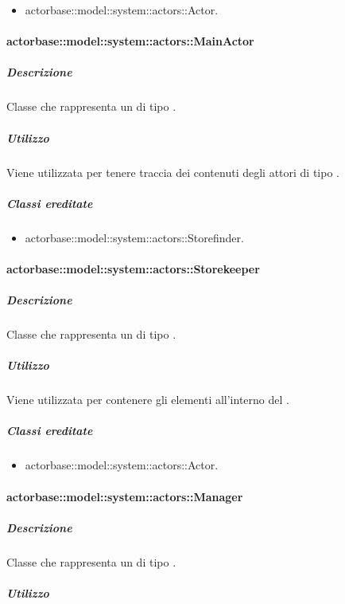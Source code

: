 \documentclass{scalatekids-article}
\begin{document}
\begin{itemize}
\item actorbase::model::system::actors::Actor.
\end{itemize}

\paragraph{actorbase::model::system::actors::MainActor}

\subparagraph{Descrizione}

Classe che rappresenta un  di tipo .

\subparagraph{Utilizzo}

Viene utilizzata per tenere traccia dei contenuti degli attori di tipo .

\subparagraph{Classi ereditate}

\begin{itemize}
\item actorbase::model::system::actors::Storefinder.
\end{itemize}

\paragraph{actorbase::model::system::actors::Storekeeper}

\subparagraph{Descrizione}

Classe che rappresenta un  di tipo .

\subparagraph{Utilizzo}

Viene utilizzata per contenere gli elementi all'interno del .

\subparagraph{Classi ereditate}

\begin{itemize}
\item actorbase::model::system::actors::Actor.
\end{itemize}

\paragraph{actorbase::model::system::actors::Manager}

\subparagraph{Descrizione}

Classe che rappresenta un  di tipo .

\subparagraph{Utilizzo}
\end{document}
